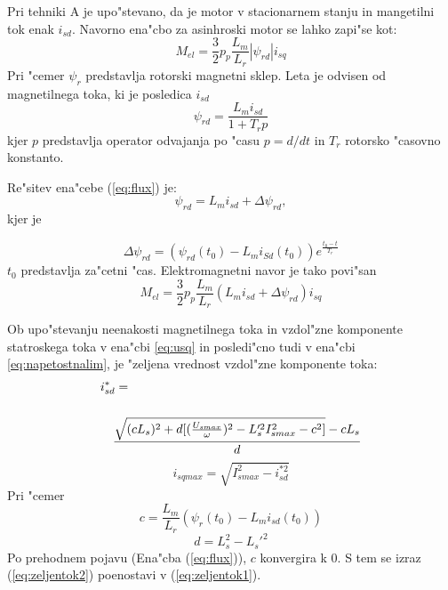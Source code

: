 \documentclass[journal,a4paper,twoside]{sty/IEEEtran}
\begin{document}
Pri tehniki A je upo"stevano, da je motor v stacionarnem stanju in mangetilni tok enak $i_{sd}$.
Navorno ena"cbo za asinhroski motor se lahko zapi"se kot:\cite{servopogoni}
\begin{equation}
\label{eq:navor2}
M_{el}=\frac{3}{2}p_p \frac{L_m}{L_r}|\psi_{rd}|i_{sq}
\end{equation}
Pri "cemer $\psi_{r}$ predstavlja rotorski magnetni sklep. Leta je odvisen od magnetilnega toka, ki je posledica $i_{sd}$
\begin{equation}
\label{eq:flux}
\psi_{rd}= \frac{L_m i_{sd}}{1+T_r p}
\end{equation}
kjer $p$ predstavlja operator odvajanja po "casu $p=d/dt$ in $T_r$ rotorsko "casovno konstanto.

Re"sitev ena"cebe (\ref{eq:flux}) je:
\begin{equation}
\label{eq:Lm+delta}
\psi_{rd}=L_m i_{sd}+\Delta \psi_{rd}\mathrm{,}
\end{equation}
 kjer je
 
 \begin{equation}
\label{eq:delta}
\Delta \psi_{rd}=(\psi_{rd}(t_0)-L_m i_{Sd}(t_0))e^{\frac{t_0-t}{T_r}}
\end{equation}
$t_0$ predstavlja za"cetni "cas. Elektromagnetni navor je tako povi"san
\begin{equation}
\label{navor3}
M_{el}=\frac{3}{2}p_p \frac{L_m}{L_r}(L_m i_{sd}+\Delta \psi_{rd})i_{sq}
\end{equation}

Ob upo"stevanju neenakosti magnetilnega toka in vzdol"zne komponente statroskega toka v ena"cbi \ref{eq:usq} in posledi"cno tudi v ena"cbi \ref{eq:napetostnalim}, je "zeljena vrednost vzdol"zne komponente toka:
\begin{equation}
\label{eq:zeljentok2}
\centering
\begin{multlined}
i_{sd}^*= \\ \\
\frac{\sqrt{(c L_s)^2+d[(\frac{U_{smax}}{\omega})^2-L_s'^2I_{smax}^2-c^2]}-cL_s}{d}                 
\end{multlined}
\end{equation}
\begin{equation}
i_{sqmax}=\sqrt{I_{smax}^2-i_{sd}^{*2}}
\end{equation}
Pri "cemer
$$c=\frac{L_m}{L_r}(\psi_{r}(t_0)-L_m i_{sd}(t_0))$$
$$d=L_s^2-L_s'^2$$
Po prehodnem pojavu (Ena"cba (\ref{eq:flux})), $c$ konvergira k 0. S tem se izraz (\ref{eq:zeljentok2}) poenostavi v (\ref{eq:zeljentok1}).\cite{vas}
\end{document}
